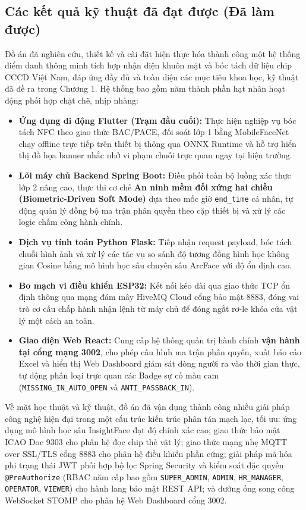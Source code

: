 ﻿\documentclass[../DoAn.tex]{subfiles}
\begin{document}
\subsection{Các kết quả kỹ thuật đã đạt được (Đã làm được)}
Đồ án đã nghiên cứu, thiết kế và cài đặt hiện thực hóa thành công một hệ thống điểm danh thông minh tích hợp nhận diện khuôn mặt và bóc tách dữ liệu chip CCCD Việt Nam, đáp ứng đầy đủ và toàn diện các mục tiêu khoa học, kỹ thuật đã đề ra trong Chương 1. Hệ thống bao gồm năm thành phần hạt nhân hoạt động phối hợp chặt chẽ, nhịp nhàng:
\begin{itemize}
    \item \textbf{Ứng dụng di động Flutter (Trạm đầu cuối):} Thực hiện nghiệp vụ bóc tách NFC theo giao thức BAC/PACE, đối soát lớp 1 bằng MobileFaceNet chạy offline trực tiếp trên thiết bị thông qua ONNX Runtime và hỗ trợ hiển thị đồ họa banner nhắc nhở vi phạm chuỗi trực quan ngay tại hiện trường.
    \item \textbf{Lõi máy chủ Backend Spring Boot:} Điều phối toàn bộ luồng xác thực lớp 2 nâng cao, thực thi cơ chế \textbf{An ninh mềm đối xứng hai chiều (Biometric-Driven Soft Mode)} dựa theo mốc giờ \texttt{end\_time} cá nhân, tự động quản lý đồng bộ ma trận phân quyền theo cặp thiết bị và xử lý các logic chấm công hành chính.
    \item \textbf{Dịch vụ tính toán Python Flask:} Tiếp nhận request payload, bóc tách chuỗi hình ảnh và xử lý các tác vụ so sánh độ tương đồng hình học không gian Cosine bằng mô hình học sâu chuyên sâu ArcFace với độ ổn định cao.
    \item \textbf{Bo mạch vi điều khiển ESP32:} Kết nối kéo dài qua giao thức TCP ổn định thông qua mạng đám mây HiveMQ Cloud cổng bảo mật 8883, đóng vai trò cơ cấu chấp hành nhận lệnh từ máy chủ để đóng ngắt rơ-le khóa cửa vật lý một cách an toàn.
    \item \textbf{Giao diện Web React:} Cung cấp hệ thống quản trị hành chính \textbf{vận hành tại cổng mạng 3002}, cho phép cấu hình ma trận phân quyền, xuất báo cáo Excel và hiển thị Web Dashboard giám sát dòng người ra vào thời gian thực, tự động phân loại trực quan các Badge sự cố màu cam (\texttt{MISSING\_IN\_AUTO\_OPEN} và \texttt{ANTI\_PASSBACK\_IN}).
\end{itemize}

Về mặt học thuật và kỹ thuật, đồ án đã vận dụng thành công nhiều giải pháp công nghệ hiện đại trong một cấu trúc kiến trúc phân tán mạch lạc, tối ưu: ứng dụng mô hình học sâu InsightFace đạt độ chính xác cao; giao thức bảo mật ICAO Doc 9303 cho phân hệ đọc chip thẻ vật lý; giao thức mạng nhẹ MQTT over SSL/TLS cổng 8883 cho phân hệ điều khiển phần cứng; giải pháp mã hóa phi trạng thái JWT phối hợp bộ lọc Spring Security và kiểm soát đặc quyền \texttt{@PreAuthorize} (RBAC năm cấp bao gồm \texttt{SUPER\_ADMIN}, \texttt{ADMIN}, \texttt{HR\_MANAGER}, \texttt{OPERATOR}, \texttt{VIEWER}) cho hành lang bảo mật REST API; và đường ống song công WebSocket STOMP cho phân hệ Web Dashboard cổng 3002.
\end{document}
